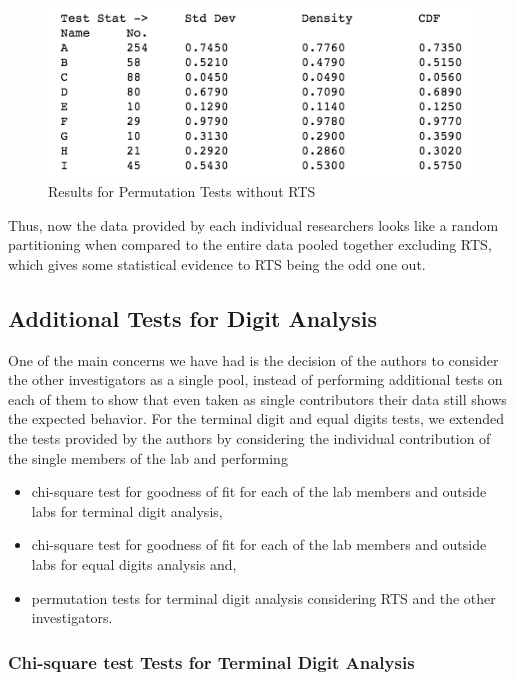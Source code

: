 \documentclass{article}
\begin{document}
\begin{figure}[htbp]
\centering
\includegraphics[width=0.8\linewidth]{images/mid_ratio_perm_no_rts.png}
\caption{Results for Permutation Tests without RTS}
\end{figure}

Thus, now the data provided by each individual researchers looks like a
random partitioning when compared to the entire data pooled together
excluding RTS, which gives some statistical evidence to RTS being the
odd one out.

    \subsection{Additional Tests for Digit
Analysis}\label{additional-tests-for-digit-analysis}

One of the main concerns we have had is the decision of the authors to
consider the other investigators as a single pool, instead of performing
additional tests on each of them to show that even taken as single
contributors their data still shows the expected behavior. For the
terminal digit and equal digits tests, we extended the tests provided by
the authors by considering the individual contribution of the single
members of the lab and performing
\begin{itemize}
    \item chi-square test for goodness of fit
for each of the lab members and outside labs for terminal digit analysis,
    \item chi-square test for goodness of fit for each of the lab
members and outside labs for equal digits analysis and,
    \item permutation tests for terminal digit analysis considering RTS and the other investigators.
 \end{itemize}

    \subsubsection{Chi-square test Tests for Terminal Digit
Analysis}\label{chi-square-test-tests-for-terminal-digit-analysis}
\end{document}
